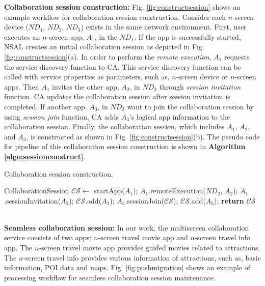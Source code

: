 \documentclass[conference]{IEEEtran}
\begin{document}
\noindent
\textbf{Collaboration session construction:}  Fig. \ref{fig:constructsession} shows an example workflow for collaboration session construction. Consider each $n$-screen device ($ND_1$, $ND_2$, $ND_3$)  exists in the same network environment. 
First, user executes an $n$-screen app, $A_1$, in the $ND_1$. If the app is successfully started, NSAL creates an initial collaboration session as depicted in Fig. \ref{fig:constructsession}(a). In order to perform the \textit{remote execution}, $A_1$ requests the service discovery function to CA.  This service discovery function can be called with service properties as parameters, such as, $n$-screen device or $n$-screen apps. Then $A_1$ invites the other app, $A_2$, in $ND_2$ through \textit{session invitation} function. CA updates the collaboration session after session invitation is completed. If another app, $A_3$, in $ND_3$ want to join the collaboration session by using \textit{session join} function, CA adds $A_3$'s logical app information to the collaboration session. Finally, the collaboration session, which includes $A_1$, $A_2$, and $A_3$, is constructed as shown in Fig. \ref{fig:constructsession}(b). 
The pseudo code for pipeline of this collaboration session construction is shown in \textbf{Algorithm \ref{algo:sessionconstruct}}.
    \begin{algorithm}
    \caption{Collaboration session construction.}
    \label{algo:sessionconstruct}
    \begin{algorithmic}[1]
       \State CollaborationSession $\mathcal{CS} \gets$ startApp($A_1$);
       \State $A_1$.remoteExecution($ND_2$, $A_2$);
       \State $A_1$.sessionInvitation($A_2$);
       \State $\mathcal{CS}$.add($A_2$);
       \State $A_3$.sessionJoin($\mathcal{CS}$);
       \State $\mathcal{CS}$.add($A_3$);
       \State \textbf{return} $\mathcal{CS}$
    \EndProcedure
    \end{algorithmic}
    \end{algorithm}
\\

\noindent
\textbf{Seamless collaboration session:}  
In our work, the multiscreen collaboration service consists of two apps; $n$-screen travel movie app and $n$-screen travel info app. 
The $n$-screen travel movie app provides guided movies related to attractions. 
The $n$-screen travel info provides various information of attractions, such as, basic information, POI data and maps.
Fig. \ref{fig:pushmigration} shows an example of processing workflow  for seamless collaboration session maintenance. 
\end{document}
